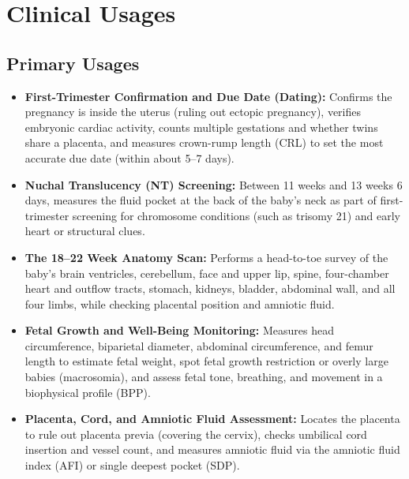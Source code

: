 \section{Clinical Usages}

\subsection{Primary Usages}
\begin{itemize}
\item \textbf{First-Trimester Confirmation and Due Date (Dating):} Confirms the pregnancy is inside the uterus (ruling out ectopic pregnancy), verifies embryonic cardiac activity, counts multiple gestations and whether twins share a placenta, and measures crown-rump length (CRL) to set the most accurate due date (within about 5--7 days).
\item \textbf{Nuchal Translucency (NT) Screening:} Between 11 weeks and 13 weeks 6 days, measures the fluid pocket at the back of the baby's neck as part of first-trimester screening for chromosome conditions (such as trisomy 21) and early heart or structural clues.
\item \textbf{The 18--22 Week Anatomy Scan:} Performs a head-to-toe survey of the baby's brain ventricles, cerebellum, face and upper lip, spine, four-chamber heart and outflow tracts, stomach, kidneys, bladder, abdominal wall, and all four limbs, while checking placental position and amniotic fluid.
\item \textbf{Fetal Growth and Well-Being Monitoring:} Measures head circumference, biparietal diameter, abdominal circumference, and femur length to estimate fetal weight, spot fetal growth restriction or overly large babies (macrosomia), and assess fetal tone, breathing, and movement in a biophysical profile (BPP).
\item \textbf{Placenta, Cord, and Amniotic Fluid Assessment:} Locates the placenta to rule out placenta previa (covering the cervix), checks umbilical cord insertion and vessel count, and measures amniotic fluid via the amniotic fluid index (AFI) or single deepest pocket (SDP).
\end{itemize}

